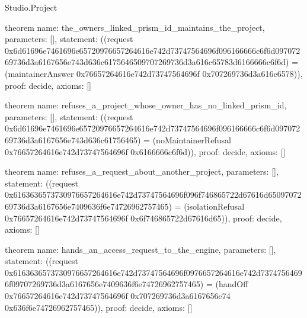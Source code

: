 \begin{lexlean}{Studio.Project}
\begin{semanticmodule}
theorem{
  name: the_owners_linked_prism_id_maintains_the_project,
  parameters: [],
  statement: ((request 0x6d61696e7461696e65720976657264616e742d73747564696f096166666c6f6d09707269736d3a6167656e743d636c6175646509707269736d3a616c65783d6166666c6f6d) = (maintainerAnswer 0x76657264616e742d73747564696f 0x707269736d3a616c6578)),
  proof: decide{},
  axioms: []
}

theorem{
  name: refuses_a_project_whose_owner_has_no_linked_prism_id,
  parameters: [],
  statement: ((request 0x6d61696e7461696e65720976657264616e742d73747564696f096166666c6f6d09707269736d3a6167656e743d636c61756465) = (noMaintainerRefusal 0x76657264616e742d73747564696f 0x6166666c6f6d)),
  proof: decide{},
  axioms: []
}

theorem{
  name: refuses_a_request_about_another_project,
  parameters: [],
  statement: ((request 0x6163636573730976657264616e742d73747564696f096f746865722d67616d6509707269736d3a6167656e7409636f6e74726962757465) = (isolationRefusal 0x76657264616e742d73747564696f 0x6f746865722d67616d65)),
  proof: decide{},
  axioms: []
}

theorem{
  name: hands_an_access_request_to_the_engine,
  parameters: [],
  statement: ((request 0x6163636573730976657264616e742d73747564696f0976657264616e742d73747564696f09707269736d3a6167656e7409636f6e74726962757465) = (handOff 0x76657264616e742d73747564696f 0x707269736d3a6167656e74 0x636f6e74726962757465)),
  proof: decide{},
  axioms: []
}
\end{semanticmodule}
\end{lexlean}
